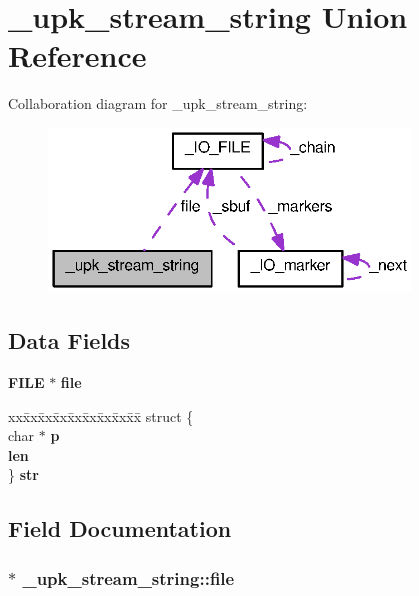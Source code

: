 \section{\_\-upk\_\-stream\_\-string Union Reference}
\label{union__upk__stream__string}


Collaboration diagram for \_\-upk\_\-stream\_\-string:
\nopagebreak
\begin{figure}[H]
\begin{center}
\leavevmode
\includegraphics[width=272pt]{union__upk__stream__string__coll__graph}
\end{center}
\end{figure}
\subsection*{Data Fields}
\begin{DoxyCompactItemize}
\item 
{\bf FILE} $\ast$ {\bf file}
\item 
\begin{tabbing}
xx\=xx\=xx\=xx\=xx\=xx\=xx\=xx\=xx\=\kill
struct \{\\
\>char $\ast$ {\bf p}\\
 {\bf len}\\
\} {\bf str}\\

\end{tabbing}\end{DoxyCompactItemize}


\subsection{Field Documentation}
\subsubsection[{file}]{$\ast$ {\bf \_\-upk\_\-stream\_\-string::file}}\label{union__upk__stream__string_a7289f52ed23f45e09f48b46c81b3e133}


